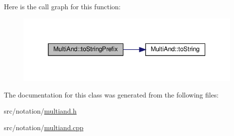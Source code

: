 Here is the call graph for this function\+:\nopagebreak
\begin{figure}[H]
\begin{center}
\leavevmode
\includegraphics[width=331pt]{d2/d2a/class_multi_and_a00dd6431f647c88e28d702dd2afb1c57_cgraph}
\end{center}
\end{figure}


The documentation for this class was generated from the following files\+:\begin{DoxyCompactItemize}
\item 
src/notation/\hyperlink{multiand_8h}{multiand.\+h}\item 
src/notation/\hyperlink{multiand_8cpp}{multiand.\+cpp}\end{DoxyCompactItemize}
